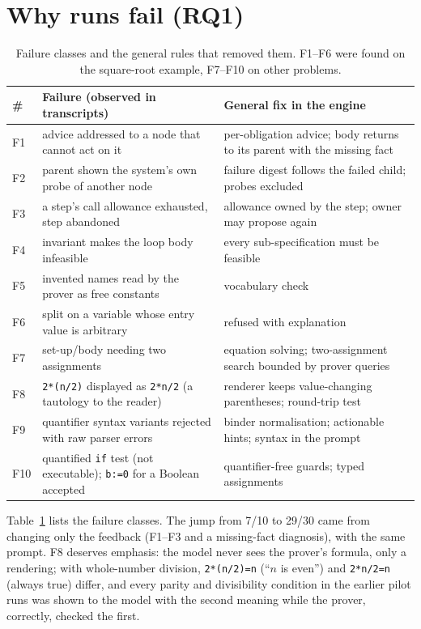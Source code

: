 \documentclass[10pt]{article}
\newcommand{\code}[1]{\texttt{#1}}
\begin{document}
\section{Why runs fail (RQ1)}
\begin{table}[t]
\centering\small
\begin{tabular}{@{}lp{6.2cm}p{6.2cm}@{}}
\toprule
\# & Failure (observed in transcripts) & General fix in the engine\\
\midrule
F1 & advice addressed to a node that cannot act on it & per-obligation advice; body returns to its parent with the missing fact\\
F2 & parent shown the system's own probe of another node & failure digest follows the failed child; probes excluded\\
F3 & a step's call allowance exhausted, step abandoned & allowance owned by the step; owner may propose again\\
F4 & invariant makes the loop body infeasible & every sub-specification must be feasible\\
F5 & invented names read by the prover as free constants & vocabulary check\\
F6 & split on a variable whose entry value is arbitrary & refused with explanation\\
F7 & set-up/body needing two assignments & equation solving; two-assignment search bounded by prover queries\\
F8 & \code{2*(n/2)} displayed as \code{2*n/2} (a tautology to the reader) & renderer keeps value-changing parentheses; round-trip test\\
F9 & quantifier syntax variants rejected with raw parser errors & binder normalisation; actionable hints; syntax in the prompt\\
F10 & quantified \code{if} test (not executable); \code{b:=0} for a Boolean accepted & quantifier-free guards; typed assignments\\
\bottomrule
\end{tabular}
\caption{Failure classes and the general rules that removed them. F1--F6 were found on the square-root example, F7--F10 on other problems.}
\label{tab:failures}
\end{table}

Table~\ref{tab:failures} lists the failure classes. The jump from 7/10 to 29/30 came from changing only the feedback (F1--F3 and a missing-fact diagnosis), with the same prompt. F8 deserves emphasis: the model never sees the prover's formula, only a rendering; with whole-number division, \code{2*(n/2)=n} (``$n$ is even'') and \code{2*n/2=n} (always true) differ, and every parity and divisibility condition in the earlier pilot runs was shown to the model with the second meaning while the prover, correctly, checked the first.
\end{document}
